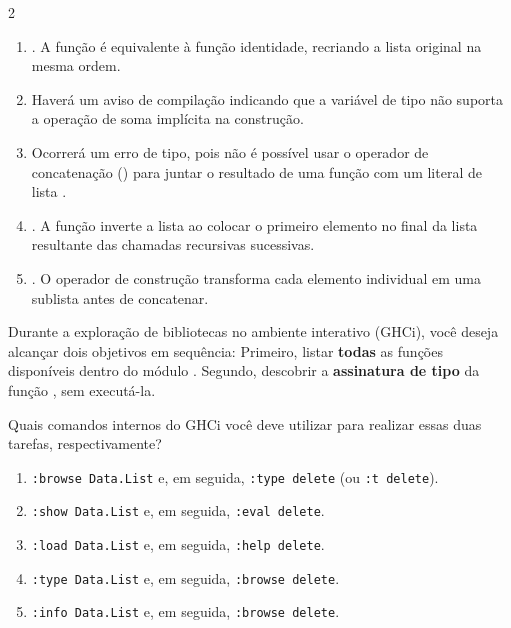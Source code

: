 \documentclass[a4paper,10pt,brazil]{article}
\begin{document}
\begin{multicols}{2}
\begin{enumerate}
  \item \haskellinline{[1, 2, 3]}. A função é equivalente à função identidade, recriando a lista original na mesma ordem.

  \item Haverá um aviso de compilação indicando que a variável de tipo  não suporta a operação de soma implícita na construção.

  \item Ocorrerá um erro de tipo, pois não é possível usar o operador de concatenação (\haskellinline{++}) para juntar o resultado de uma função com um literal de lista \haskellinline{[x]}.

  \item \haskellinline{[3, 2, 1]}. A função inverte a lista ao colocar o primeiro elemento no final da lista resultante das chamadas recursivas sucessivas.

  \item \haskellinline{[[1], [2], [3]]}. O operador de construção transforma cada elemento individual em uma sublista antes de concatenar.


\end{enumerate}

Durante a exploração de bibliotecas no ambiente interativo (GHCi), você deseja alcançar dois objetivos em sequência:
Primeiro, listar \textbf{todas} as funções disponíveis dentro do módulo .
Segundo, descobrir a \textbf{assinatura de tipo} da função , sem executá-la.

Quais comandos internos do GHCi você deve utilizar para realizar essas duas tarefas, respectivamente?

\begin{enumerate}
  \item \texttt{:browse Data.List} e, em seguida, \texttt{:type delete} (ou \texttt{:t delete}).

  \item \texttt{:show Data.List} e, em seguida, \texttt{:eval delete}.

  \item \texttt{:load Data.List} e, em seguida, \texttt{:help delete}.

  \item \texttt{:type Data.List} e, em seguida, \texttt{:browse delete}.

  \item \texttt{:info Data.List} e, em seguida, \texttt{:browse delete}.



\end{enumerate}
\end{multicols}
\end{document}
